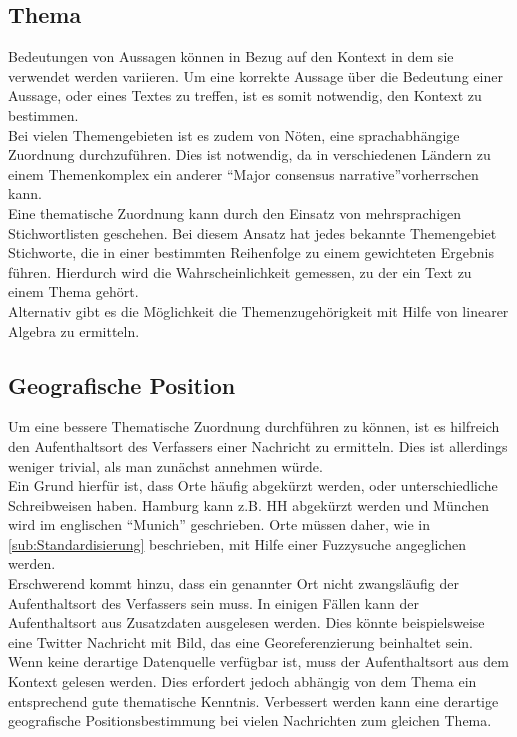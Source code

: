 \documentclass[twoside,a4paper]{article}
\begin{document}
\subsection{Thema}
Bedeutungen von Aussagen können in Bezug auf den Kontext in dem sie verwendet werden variieren. Um eine korrekte Aussage über die Bedeutung einer Aussage, oder eines Textes zu treffen, ist es somit notwendig, den Kontext zu bestimmen.\\
Bei vielen Themengebieten ist es zudem von Nöten, eine sprachabhängige Zuordnung durchzuführen. Dies ist notwendig, da in verschiedenen Ländern zu einem Themenkomplex ein anderer \enquote{Major consensus narrative}\footnotemark vorherrschen kann.\\
\noindent Eine thematische Zuordnung kann durch den Einsatz von mehrsprachigen Stichwortlisten geschehen. Bei diesem Ansatz hat jedes bekannte Themengebiet Stichworte, die in einer bestimmten Reihenfolge zu einem gewichteten Ergebnis führen. Hierdurch wird die Wahrscheinlichkeit gemessen, zu der ein Text zu einem Thema gehört.\\
Alternativ gibt es die Möglichkeit die Themenzugehörigkeit mit Hilfe von linearer Algebra zu ermitteln.


\subsection{Geografische Position}
Um eine bessere Thematische Zuordnung durchführen zu können, ist es hilfreich den Aufenthaltsort des Verfassers einer Nachricht zu ermitteln. Dies ist allerdings weniger trivial, als man zunächst annehmen würde.\\
\noindent Ein Grund hierfür ist, dass Orte häufig abgekürzt werden, oder unterschiedliche Schreibweisen haben. Hamburg kann z.B. HH abgekürzt werden und München wird im englischen \enquote{Munich} geschrieben. Orte müssen daher, wie in \ref{sub:Standardisierung} beschrieben, mit Hilfe einer Fuzzysuche angeglichen werden.\\
Erschwerend kommt hinzu, dass ein genannter Ort nicht zwangsläufig der Aufenthaltsort des Verfassers sein muss. In einigen Fällen kann der Aufenthaltsort aus Zusatzdaten ausgelesen werden. Dies könnte beispielsweise eine Twitter Nachricht mit Bild, das eine Georeferenzierung beinhaltet sein.\\
Wenn keine derartige Datenquelle verfügbar ist, muss der Aufenthaltsort aus dem Kontext gelesen werden. Dies erfordert jedoch abhängig von dem Thema ein entsprechend gute thematische Kenntnis. Verbessert werden kann eine derartige geografische Positionsbestimmung bei vielen Nachrichten zum gleichen Thema. 
\end{document}
